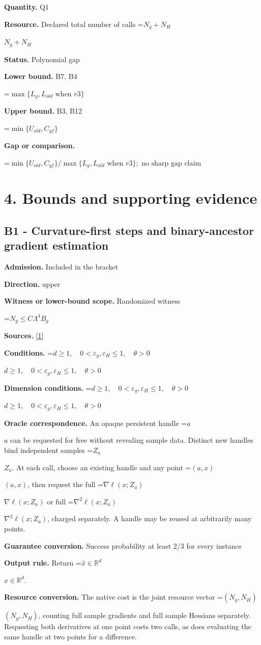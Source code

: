 \documentclass[10pt,a4paper]{article}
\newcommand{\AtlasMath}[1]{\par\begingroup\centering\setbox0=\hbox{$\displaystyle #1$}\ifdim\wd0>1.4\linewidth\typeout{ATLAS WIDE FORMULA: \the\wd0}\fi\ifdim\wd0>\linewidth\resizebox{\linewidth}{!}{\box0}\else\box0\fi\par\endgroup}
\newcommand{\AtlasInlineMath}[1]{\begingroup\setbox0=\hbox{$#1$}\ifdim\wd0>.4\linewidth\endgroup\AtlasMath{#1}\else\endgroup$#1$\fi}
\begin{document}
\textbf{Quantity.} Q1

\textbf{Resource.} Declared total number of calls \AtlasInlineMath{N_g+N_H}

\textbf{Status.} Polynomial gap

\textbf{Lower bound.} B7, B4

\AtlasMath{\max\{L_g,L_{old}\text{ when }r3\}}
\textbf{Upper bound.} B3, B12

\AtlasMath{\min\{U_{old},C_{gf}\}}
\textbf{Gap or comparison.}

\AtlasMath{\min\{U_{old},C_{gf}\}/\max\{L_g,L_{old}\text{ when }r3\};\text{ no sharp gap claim}}
\section{4. Bounds and supporting evidence}
\subsection{B1 - Curvature-first steps and binary-ancestor gradient estimation}
\textbf{Admission.} Included in the bracket

\textbf{Direction.} upper

\textbf{Witness or lower-bound scope.} Randomized witness

\AtlasMath{N_g\le C\Lambda^4 B_g}
\textbf{Sources.} \href{https://arxiv.org/pdf/2610.16832v2}{[1]}

\textbf{Conditions.} \AtlasInlineMath{d\ge1,\quad0<\varepsilon_g,\varepsilon_H\le1,\quad\theta>0}

\textbf{Dimension conditions.} \AtlasInlineMath{d\ge1,\quad0<\varepsilon_g,\varepsilon_H\le1,\quad\theta>0}

\textbf{Oracle correspondence.} An opaque persistent handle \AtlasInlineMath{a} can be requested for free without revealing sample data. Distinct new handles bind independent samples \AtlasInlineMath{Z_a}. At each call, choose an existing handle and any point \AtlasInlineMath{(a,x)}, then request the full \AtlasInlineMath{\nabla\ell(x;Z_a)} or full \AtlasInlineMath{\nabla^2\ell(x;Z_a)}, charged separately. A handle may be reused at arbitrarily many points.

\textbf{Guarantee conversion.} Success probability at least 2/3 for every instance

\textbf{Output rule.} Return \AtlasInlineMath{\widehat{x}\in \mathbb{R}^d}.

\textbf{Resource conversion.} The native cost is the joint resource vector \AtlasInlineMath{(N_g,N_H)}, counting full sample gradients and full sample Hessians separately. Requesting both derivatives at one point costs two calls, as does evaluating the same handle at two points for a difference.
\end{document}

